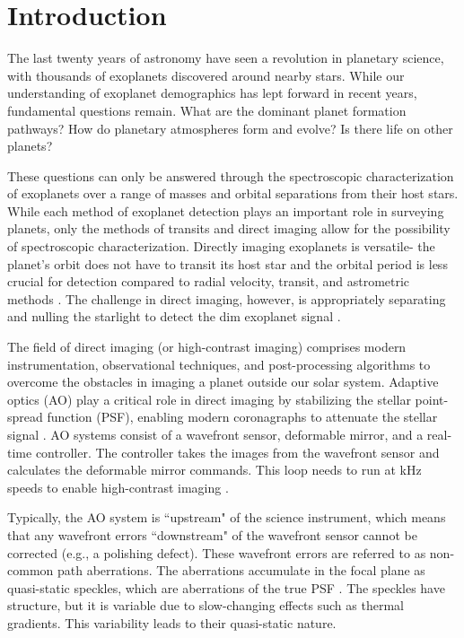 \section{Introduction} \label{sec:intro}

The last twenty years of astronomy have seen a revolution in planetary science, with thousands of exoplanets discovered around nearby stars. While our understanding of exoplanet demographics has lept forward in recent years, fundamental questions remain. What are the dominant planet formation pathways? How do planetary atmospheres form and evolve? Is there life on other planets?

These questions can only be answered through the spectroscopic characterization of exoplanets over a range of masses and orbital separations from their host stars. While each method of exoplanet detection plays an important role in surveying planets, only the methods of transits and direct imaging allow for the possibility of spectroscopic characterization. Directly imaging exoplanets is versatile- the planet's orbit does not have to transit its host star and the orbital period is less crucial for detection compared to radial velocity, transit, and astrometric methods \citep{2013pss3.book..489W}. The challenge in direct imaging, however, is appropriately separating and nulling the starlight to detect the dim exoplanet signal \citep{2010exop.book..111T}.

The field of direct imaging (or high-contrast imaging) comprises modern instrumentation, observational techniques, and post-processing algorithms to overcome the obstacles in imaging a planet outside our solar system. Adaptive optics (AO) play a critical role in direct imaging by stabilizing the stellar point-spread function (PSF), enabling modern coronagraphs to attenuate the stellar signal \citep{2005ApJ...629..592G}. AO systems consist of a wavefront sensor, deformable mirror, and a real-time controller. The controller takes the images from the wavefront sensor and calculates the deformable mirror commands. This loop needs to run at kHz speeds to enable high-contrast imaging \citep{2018ARA&A..56..315G}.

Typically, the AO system is ``upstream" of the science instrument, which means that any wavefront errors ``downstream" of the wavefront sensor cannot be corrected (e.g., a polishing defect). These wavefront errors are referred to as non-common path aberrations. The aberrations accumulate in the focal plane as quasi-static speckles, which are aberrations of the true PSF \citep{2018ARA&A..56..315G}. The speckles have structure, but it is variable due to slow-changing effects such as thermal gradients. This variability leads to their quasi-static nature.

